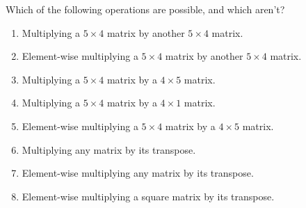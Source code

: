 \documentclass[11pt]{article}
\begin{document}
\begin{Exercise}
\noindent Which of the following operations are possible, and which aren't?

\begin{enumerate}
\item Multiplying a $5 \times 4$ matrix by another $5 \times 4$ matrix. 
\item Element-wise multiplying a $5 \times 4$ matrix by another $5 \times 4$ matrix. 
\item Multiplying a $5 \times 4$ matrix by a $4 \times 5$ matrix. 
\item Multiplying a $5 \times 4$ matrix by a $4 \times 1$ matrix. 
\item Element-wise multiplying a $5 \times 4$ matrix by a $4 \times 5$ matrix. 
\item Multiplying any matrix by its transpose. 
\item Element-wise multiplying any matrix by its transpose. 
\item Element-wise multiplying a square matrix by its transpose. 
\end{enumerate}
\end{Exercise}

\end{document}
